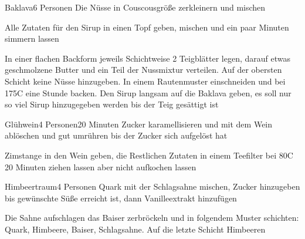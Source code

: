 

\begin{recipe}{Baklava}{6 Personen}{}
Die Nüsse in Couscousgröße zerkleinern und mischen

Alle Zutaten für den Sirup in einen Topf geben, mischen und ein paar Minuten simmern lassen

In einer flachen Backform jeweils Schichtweise 2 Teigblätter legen, darauf etwas geschmolzene Butter und ein Teil der Nussmixtur verteilen. Auf der obersten Schicht keine Nüsse hinzugeben.
In einem Rautenmuster einschneiden und bei 175\0C eine Stunde backen.
Den Sirup langsam auf die Baklava geben, es soll nur so viel Sirup hinzugegeben werden bis der Teig gesättigt ist
\end{recipe}


\begin{recipe}{Glühwein}{4 Personen}{20 Minuten}
Zucker karamellisieren und mit dem Wein ablöschen und gut umrühren bis der Zucker sich aufgelöst hat

Zimstange in den Wein geben, die Restlichen Zutaten in einem Teefilter bei 80\0C 20 Minuten ziehen lassen aber nicht aufkochen lassen
\end{recipe}


\begin{recipe}{Himbeertraum}{4 Personen}{}
Quark mit der Schlagsahne mischen, Zucker hinzugeben bis gewünschte Süße erreicht ist, dann Vanilleextrakt hinzufügen

Die Sahne aufschlagen das Baiser zerbröckeln und in folgendem Muster schichten: 
Quark, Himbeere, Baiser, Schlagsahne. Auf die letzte Schicht Himbeeren
\end{recipe}

